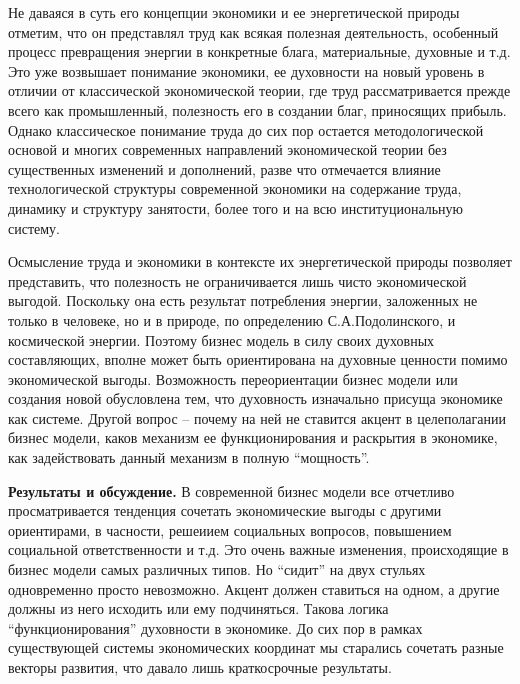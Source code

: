 \begin{multicols}{2}
Не даваяся в суть его концепции экономики и ее энергетической природы
отметим, что он представлял труд как всякая полезная деятельность,
особенный процесс превращения энергии в конкретные блага, материальные,
духовные и т.д. Это уже возвышает понимание экономики, ее духовности на
новый уровень в отличии от классической экономической теории, где труд
рассматривается прежде всего как промышленный, полезность его в создании
благ, приносящих прибыль. Однако классическое понимание труда до сих пор
остается методологической основой и многих современных направлений
экономической теории без существенных изменений и дополнений, разве что
отмечается влияние технологической структуры современной экономики на
содержание труда, динамику и структуру занятости, более того и на всю
институциональную систему.

Осмысление труда и экономики в контексте их энергетической природы
позволяет представить, что полезность не ограничивается лишь чисто
экономической выгодой. Поскольку она есть результат потребления энергии,
заложенных не только в человеке, но и в природе, по определению
С.А.Подолинского, и космической энергии. Поэтому бизнес модель в силу
своих духовных составляющих, вполне может быть ориентирована на духовные
ценности помимо экономической выгоды. Возможность переориентации бизнес
модели или создания новой обусловлена тем, что духовность изначально
присуща экономике как системе. Другой вопрос -- почему на ней не
ставится акцент в целеполагании бизнес модели, каков механизм ее
функционирования и раскрытия в экономике, как задействовать данный
механизм в полную ``мощность''.

{\bfseries Результаты и обсуждение.} В современной бизнес модели все
отчетливо просматривается тенденция сочетать экономические выгоды с
другими ориентирами, в часности, решеиием социальных вопросов,
повышением социальной ответственности и т.д. Это очень важные изменения,
происходящие в бизнес модели самых различных типов. Но ``сидит'' на двух
стульях одновременно просто невозможно. Акцент должен ставиться на
одном, а другие должны из него исходить или ему подчиняться. Такова
логика ``функционирования'' духовности в экономике. До сих пор в рамках
существующей системы экономических координат мы старались сочетать
разные векторы развития, что давало лишь краткосрочные результаты.


\end{multicols}
